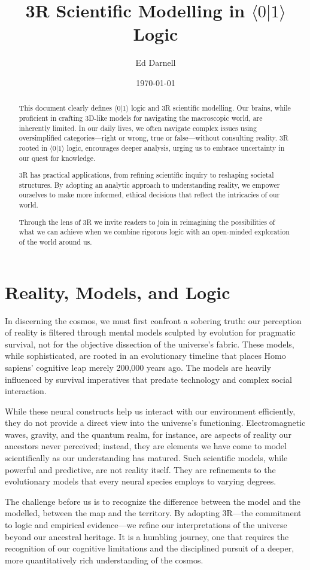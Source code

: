 \documentclass[12pt]{article}
\author{Ed Darnell}
\date{\today}
\newcommand{\qbit}{\ensuremath{\langle 0 | 1 \rangle}}
\begin{document}
\title{3R Scientific Modelling in \(\qbit\) Logic}
\begin{abstract}
    This document clearly defines \(\qbit\) logic and 3R scientific modelling. Our brains, while proficient in crafting 3D-like models for navigating the macroscopic world, are inherently limited. In our daily lives, we often navigate complex issues using oversimplified categories—right or wrong, true or false—without consulting reality. 3R rooted in \qbit{} logic, encourages deeper analysis, urging us to embrace uncertainty in our quest for knowledge.

    3R has practical applications, from refining scientific inquiry to reshaping societal structures. By adopting an analytic approach to understanding reality, we empower ourselves to make more informed, ethical decisions that reflect the intricacies of our world.

    Through the lens of 3R we invite readers to join in reimagining the possibilities of what we can achieve when we combine rigorous logic with an open-minded exploration of the world around us.
\end{abstract}
\section*{Reality, Models, and Logic}
In discerning the cosmos, we must first confront a sobering truth: our perception of reality is filtered through mental models sculpted by evolution for pragmatic survival, not for the objective dissection of the universe's fabric. These models, while sophisticated, are rooted in an evolutionary timeline that places Homo sapiens' cognitive leap merely 200,000 years ago. The models are heavily influenced by survival imperatives that predate technology and complex social interaction.

While these neural constructs help us interact with our environment efficiently, they do not provide a direct view into the universe's functioning. Electromagnetic waves, gravity, and the quantum realm, for instance, are aspects of reality our ancestors never perceived; instead, they are elements we have come to model scientifically as our understanding has matured. Such scientific models, while powerful and predictive, are not reality itself. They are refinements to the evolutionary models that every neural species employs to varying degrees.

The challenge before us is to recognize the difference between the model and the modelled, between the map and the territory. By adopting 3R—the commitment to logic and empirical evidence—we refine our interpretations of the universe beyond our ancestral heritage. It is a humbling journey, one that requires the recognition of our cognitive limitations and the disciplined pursuit of a deeper, more quantitatively rich understanding of the cosmos.
\end{document}
